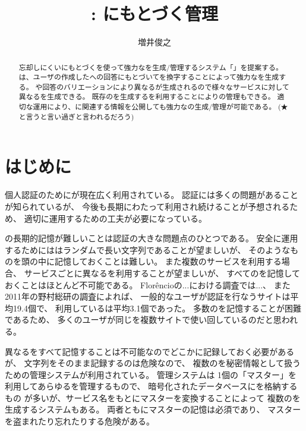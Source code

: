 \documentclass[twoside]{wiss}
\begin{document}
\title{{\EP}: {\EM}にもとづく{\PW}管理}

\author{増井俊之}

\begin{abstract}
忘却しにくい{\EM}にもとづく{\SQ}を使って強力な{\PW}を生成/管理するシステム「\textsf{\EP}」を提案する。
{\EP}は、ユーザの作成した{\SQ}への回答にもとづいて{\SS}を換字することによって強力な{\PW}を生成する。
{\SS}や回答のバリエーションにより異なる{\PW}が生成されるので様々なサービスに対して異なる{\PW}を生成できる。
既存の{\PW}を生成する{\SS}を利用することにより{\PW}の管理もできる。
適切な運用により、{\PW}に関連する情報を公開しても強力な{\PW}の生成/管理が可能である。
(★と言うと言い過ぎと言われるだろう)
\end{abstract}

\maketitle

\section{はじめに}

個人認証のために{\PW}が現在広く利用されている。
{\PW}認証には多くの問題があることが知られているが\cite{増井_ユニマガ}、
今後も長期にわたって利用され続けることが予想されるため、
適切に運用するための工夫が必要になっている。

{\PW}の長期的記憶が難しいことは{\PW}認証の大きな問題点のひとつである。
安全に運用するためには{\PW}はランダムで長い文字列であることが望ましいが、
そのようなものを頭の中に記憶しておくことは難しい。
また複数のサービスを利用する場合、
サービスごとに異なる{\PW}を利用することが望ましいが、
すべての{\PW}を記憶しておくことはほとんど不可能である。
%
Flor\^{e}ncioの...における調査では...\cite{Florencio:2007:LSW:1242572.1242661}、
また2011年の野村総研の調査によれば、
一般的なユーザが{\PW}認証を行なうサイトは平均19.4個で、
利用している{\PW}は平均3.1個であった\cite{野村総研}。
多数の{\PW}を記憶することが困難であるため、
多くのユーザが同じ{\PW}を複数サイトで使い回しているのだと思われる。

異なる{\PW}をすべて記憶することは不可能なのでどこかに記録しておく必要があるが、
{\PW}文字列をそのまま記録するのは危険なので、
複数の{\PW}を秘密情報として扱うための{\PW}管理システムが利用されている。
{\PW}管理システムは
1個の「マスター{\PW}」を利用してあらゆる{\PW}を管理するもので、
暗号化されたデータベースに{\PW}を格納するもの%
\cite{OnePassword}%
\cite{Dashlane}%
\cite{ミルパス}%
\cite{LastPass}%
\cite{KeyPass}%
\cite{NortonIDSafe}%
\cite{IDManager}%
が多いが、サービス名をもとにマスター{\PW}を変換することによって
複数の{\PW}を生成するシステム\cite{SuperGenPass}もある。
両者ともにマスター{\PW}の記憶は必須であり、
マスター{\PW}を盗まれたり忘れたりする危険がある。
\end{document}
